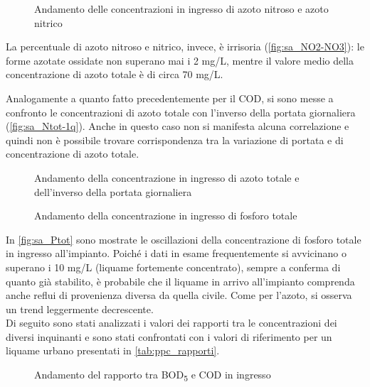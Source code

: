 \begin{figure}[H]
	\fbox{\texttt{[image: sa\_NO2-NO3]}}
	\centering
	\caption{Andamento delle concentrazioni in ingresso di azoto nitroso e azoto nitrico}
	\label{fig:sa_NO2-NO3}
\end{figure}

La percentuale di azoto nitroso e nitrico, invece, è irrisoria (\autoref{fig:sa_NO2-NO3}): le forme azotate ossidate non superano mai i 2 mg/L, mentre il valore medio della concentrazione di azoto totale è di circa 70 mg/L.

Analogamente a quanto fatto precedentemente per il COD, si sono messe a confronto le concentrazioni di azoto totale  con l’inverso della portata giornaliera (\autoref{fig:sa_Ntot-1q}).
Anche in questo caso non si manifesta alcuna correlazione e quindi non è possibile trovare corrispondenza tra la variazione di portata e di concentrazione di azoto totale.
\begin{figure}[H]
	\centering
	\caption{Andamento della concentrazione in ingresso di azoto totale e dell'inverso della portata giornaliera}
	\label{fig:sa_Ntot-1q}
\end{figure}
\begin{figure}[H]
	\centering
	\caption{Andamento della concentrazione in ingresso di fosforo totale}
	\label{fig:sa_Ptot}
\end{figure}

In \autoref{fig:sa_Ptot} sono mostrate le oscillazioni della concentrazione di fosforo totale in ingresso all’impianto.
Poiché i dati in esame frequentemente si avvicinano o superano i 10 mg/L (liquame fortemente concentrato), sempre a conferma di quanto già stabilito, è probabile che il liquame in arrivo all’impianto comprenda anche reflui di provenienza diversa da quella civile. Come per l'azoto, si osserva un trend leggermente decrescente.\\

Di seguito sono stati analizzati i valori dei rapporti tra le concentrazioni dei diversi inquinanti e sono stati confrontati con i valori di riferimento per un liquame urbano presentati in \autoref{tab:ppc_rapporti}.

\begin{figure}[H]
	\centering
	\caption{Andamento del rapporto tra BOD\textsubscript{5} e COD in ingresso}
	\label{fig:sa_BOD_COD}
\end{figure}

